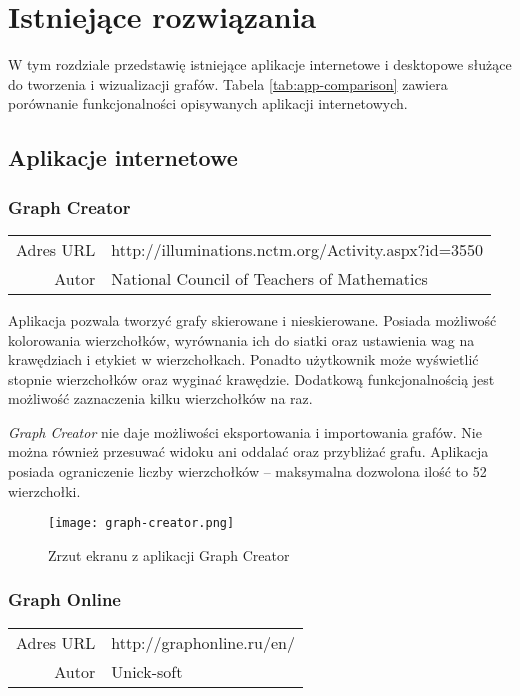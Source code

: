 \chapter{Istniejące rozwiązania}

W tym rozdziale przedstawię istniejące aplikacje internetowe \cite{mathex} i desktopowe służące do tworzenia i wizualizacji grafów. Tabela \ref{tab:app-comparison} zawiera porównanie funkcjonalności opisywanych aplikacji internetowych.

\section{Aplikacje internetowe}

\subsection*{Graph Creator}
\bigskip
\noindent\begin{tabularx}{\textwidth}{r|X|}
\cline{2-2}
  Adres URL & http://illuminations.nctm.org/Activity.aspx?id=3550 \\ 
\cline{2-2}
 Autor & National Council of Teachers of Mathematics \\ 
\cline{2-2}
\end{tabularx} 
\bigskip

Aplikacja pozwala tworzyć grafy skierowane i nieskierowane. Posiada możliwość kolorowania wierzchołków, wyrównania ich do siatki oraz ustawienia wag na krawędziach i etykiet w wierzchołkach. Ponadto użytkownik może wyświetlić stopnie wierzchołków oraz wyginać krawędzie. Dodatkową funkcjonalnością jest możliwość zaznaczenia kilku wierzchołków na raz. 

\textit{Graph Creator} nie daje możliwości eksportowania i importowania grafów. Nie można również przesuwać widoku ani oddalać oraz przybliżać grafu. Aplikacja posiada ograniczenie liczby wierzchołków -- maksymalna dozwolona ilość to 52 wierzchołki.

\begin{figure}[H]
\caption{Zrzut ekranu z aplikacji Graph Creator}
\centering
\texttt{[image: graph-creator.png]}
\end{figure}

\subsection*{Graph Online}
\bigskip
\noindent\begin{tabularx}{\textwidth}{r|X|}
\cline{2-2}
  Adres URL & http://graphonline.ru/en/ \\ 
\cline{2-2}
 Autor & Unick-soft \\ 
\cline{2-2}
\end{tabularx} 
\bigskip

